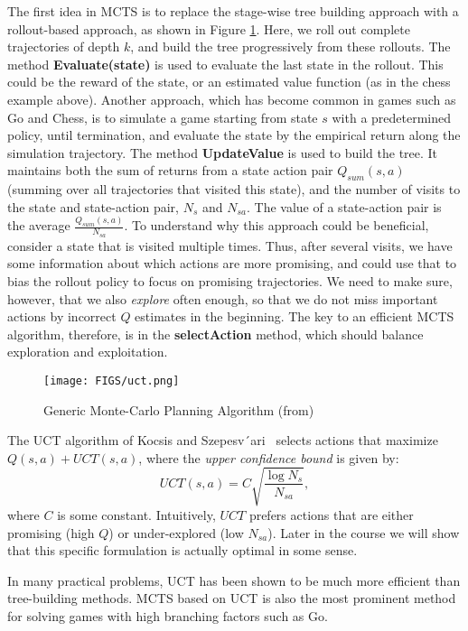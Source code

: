 The first idea in MCTS is to replace the stage-wise tree building approach with a rollout-based approach, as shown in Figure \ref{fig:mcts}. Here, we roll out complete trajectories of depth $k$, and build the tree progressively from these rollouts. The method \textbf{Evaluate(state)} is used to evaluate the last state in the rollout. This could be the reward of the state, or an estimated value function (as in the chess example above). Another approach, which has become common in games such as Go and Chess, is to simulate a game starting from state $s$ with a predetermined policy, until termination, and evaluate the state by the empirical return along the simulation trajectory.
The method \textbf{UpdateValue} is used to build the tree. It maintains both the sum of returns from a state action pair $Q_{sum}(s,a)$ (summing over all trajectories that visited this state), and the number of visits to the state and state-action pair, $N_s$ and $N_{sa}$. The value of a state-action pair is the average $\frac{Q_{sum}(s,a)}{N_{sa}}$. To understand why this approach could be beneficial, consider a state that is visited multiple times. Thus, after several visits, we have some information about which actions are more promising, and could use that to bias the rollout policy to focus on promising trajectories. We need to make sure, however, that we also \emph{explore} often enough, so that we do not miss important actions by incorrect $Q$ estimates in the beginning.
The key to an efficient MCTS algorithm, therefore, is in the \textbf{selectAction} method, which should balance exploration and exploitation.

\begin{figure}[h]
    \centering
    \texttt{[image: FIGS/uct.png]}
    \caption{Generic Monte-Carlo Planning Algorithm (from\cite{kocsis2006bandit})}
    \label{fig:mcts}
\end{figure}

The UCT algorithm of Kocsis and Szepesv´ari~\cite{kocsis2006bandit} selects actions that maximize $Q(s,a) + UCT(s,a)$, where the \emph{upper confidence bound} is given by: 
$$
UCT(s,a) = C \sqrt{\frac{\log N_s}{N_{sa}}},
$$
where $C$ is some constant. Intuitively, $UCT$ prefers actions that are either promising (high $Q$) or under-explored (low $N_{sa}$). Later in the course we will show that this specific formulation is actually optimal in some sense.

In many practical problems, UCT has been shown to be much more efficient than tree-building methods. MCTS based on UCT is also the most prominent method for solving games with high branching factors such as Go. 

